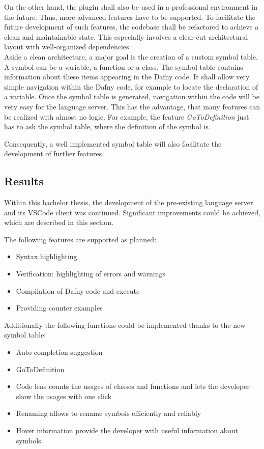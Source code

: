 On the other hand, the plugin shall also be used in a professional environment in the future.
Thus, more advanced features have to be supported.
To facilitate the future development of such features, the codebase shall be refactored to achieve a clean and maintainable state.
This especially involves a clear-cut architectural layout with well-organized dependencies.\\

Aside a clean architecture, a major goal is the creation of a custom symbol table.
A symbol can be a variable, a function or a class.
The symbol table contains information about these items appearing in the Dafny code.
It shall allow very simple navigation within the Dafny code, for example to locate the declaration of a variable.
Once the symbol table is generated, navigation within the code will be very easy for the language server.
This has the advantage, that many features can be realized with almost no logic.
For example, the feature \textit{GoToDefinition} just has to ask the symbol table, where the definition of the symbol is.

Consequently, a well implemented symbol table will also facilitate the development of further features.

\subsection{Results}
Within this bachelor thesis, the development of the pre-existing language server and its VSCode client was continued.
Significant improvements could be achieved, which are described in this section.

The following features are supported as planned:
\begin{itemize}
    \item Syntax highlighting
    \item Verification: highlighting of errors and warnings
    \item Compilation of Dafny code and execute
    \item Providing counter examples
\end{itemize}

Additionally the following functions could be implemented thanks to the new symbol table:
\begin{itemize}
    \item Auto completion suggestion
    \item GoToDefinition
    \item Code lens counts the usages of classes and functions and lets the developer show the usages with one click
    \item Renaming allows to rename symbols efficiently and reliably
    \item Hover information provide the developer with useful information about symbols
\end{itemize}

